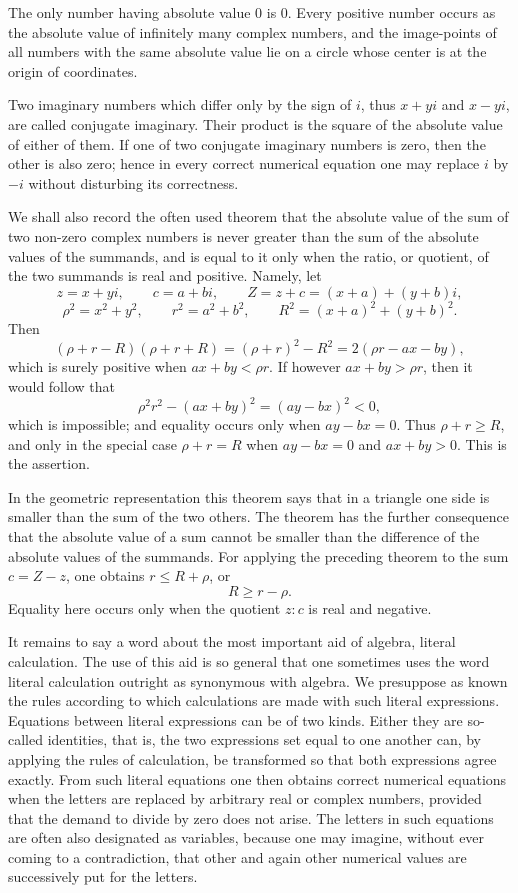 \documentclass[11pt]{article}
\begin{document}
The only number having absolute value $0$ is $0$. Every positive number occurs as the absolute value of infinitely many complex numbers, and the image-points of all numbers with the same absolute value lie on a circle whose center is at the origin of coordinates.

Two imaginary numbers which differ only by the sign of $i$, thus $x+yi$ and $x-yi$, are called conjugate imaginary. Their product is the square of the absolute value of either of them. If one of two conjugate imaginary numbers is zero, then the other is also zero; hence in every correct numerical equation one may replace $i$ by $-i$ without disturbing its correctness.

We shall also record the often used theorem that the absolute value of the sum of two non-zero complex numbers is never greater than the sum of the absolute values of the summands, and is equal to it only when the ratio, or quotient, of the two summands is real and positive. Namely, let
\[
 z=x+yi,
 \qquad c=a+bi,
 \qquad Z=z+c=(x+a)+(y+b)i,
\]
\[
 \rho^2=x^2+y^2,
 \qquad r^2=a^2+b^2,
 \qquad R^2=(x+a)^2+(y+b)^2.
\]
Then
\[
 (\rho+r-R)(\rho+r+R)=(\rho+r)^2-R^2=2(\rho r-ax-by),
\]
which is surely positive when $ax+by<\rho r$. If however $ax+by>\rho r$, then it would follow that
\[
 \rho^2r^2-(ax+by)^2=(ay-bx)^2<0,
\]
which is impossible; and equality occurs only when $ay-bx=0$. Thus $\rho+r\ge R$, and only in the special case $\rho+r=R$ when $ay-bx=0$ and $ax+by>0$. This is the assertion.

In the geometric representation this theorem says that in a triangle one side is smaller than the sum of the two others. The theorem has the further consequence that the absolute value of a sum cannot be smaller than the difference of the absolute values of the summands. For applying the preceding theorem to the sum $c=Z-z$, one obtains $r\le R+\rho$, or
\[
 R\ge r-\rho.
\]
Equality here occurs only when the quotient $z:c$ is real and negative.

It remains to say a word about the most important aid of algebra, literal calculation. The use of this aid is so general that one sometimes uses the word literal calculation outright as synonymous with algebra. We presuppose as known the rules according to which calculations are made with such literal expressions. Equations between literal expressions can be of two kinds. Either they are so-called identities, that is, the two expressions set equal to one another can, by applying the rules of calculation, be transformed so that both expressions agree exactly. From such literal equations one then obtains correct numerical equations when the letters are replaced by arbitrary real or complex numbers, provided that the demand to divide by zero does not arise. The letters in such equations are often also designated as variables, because one may imagine, without ever coming to a contradiction, that other and again other numerical values are successively put for the letters.
\end{document}
